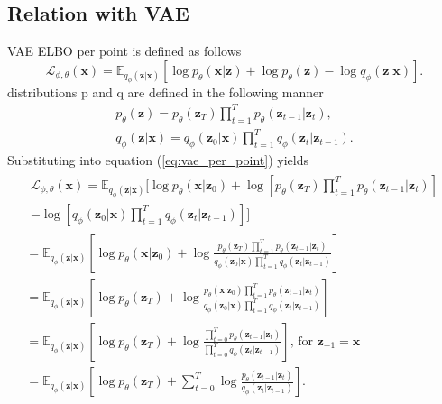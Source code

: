 \documentclass[10pt]{article}
\begin{document}
\subsection{Relation with VAE}
VAE ELBO per point is defined as follows
\begin{equation}
\label{eq:vae_per_point}
    \mathcal{L}_{\phi, \theta}(\textbf{x}) =  
      \mathbb{E}_{q_{\phi }(\textbf{z}|\textbf{x})}
    \left[ \log p_{\theta }(\textbf{x}| \textbf{z}) +\log p_{\theta}(\textbf{z}) -
   \log q_{\phi }(\textbf{z}|\textbf{x}) \right].
\end{equation}
distributions p and q are defined in the following manner
\begin{gather}
   p_{\theta}(\textbf{z}) = p_{\theta}(\textbf{z}_T)
   \prod^{T}_{t=1} p_{\theta}(\textbf{z}_{t-1}| \textbf{z}_{t}), \\ 
   q_{\phi }(\textbf{z}|\textbf{x})  = q_{\phi }(\textbf{z}_0|\textbf{x}) 
   \prod^{T}_{t=1}  q_{\phi }(\textbf{z}_{t}| \textbf{z}_{t-1}) .
\end{gather}
Substituting into equation (\ref{eq:vae_per_point}) yields
\begin{gather}
    \begin{gathered}
    \mathcal{L}_{\phi, \theta}(\textbf{x}) =  
      \mathbb{E}_{q_{\phi }(\textbf{z}|\textbf{x})}
    \Bigg[ \log p_{\theta }(\textbf{x}| \textbf{z}_0) +
    \log[p_{\theta}(\textbf{z}_T)\prod^{T}_{t=1} p_{\theta}(\textbf{z}_{t-1}| \textbf{z}_{t})]\\ -
   \log [q_{\phi }(\textbf{z}_0|\textbf{x}) 
   \prod^{T}_{t=1}  q_{\phi }(\textbf{z}_{t}| \textbf{z}_{t-1}) ]
   \Bigg] 
       \end{gathered}
       \\
   = \mathbb{E}_{q_{\phi }(\textbf{z}|\textbf{x})} \left[\log p_{\theta }(\textbf{x}| \textbf{z}_0) + \log \frac
   {p_{\theta}(\textbf{z}_T)\prod^{T}_{t=1} p_{\theta}(\textbf{z}_{t-1}| \textbf{z}_{t})}
   {q_{\phi }(\textbf{z}_0|\textbf{x})\prod^{T}_{t=1}  q_{\phi }(\textbf{z}_{t}| \textbf{z}_{t-1})}
   \right] \\
   = \mathbb{E}_{q_{\phi }(\textbf{z}|\textbf{x})} \left[ \log p_{\theta}(\textbf{z}_T) +
   \log \frac
   {p_{\theta }(\textbf{x}| \textbf{z}_0) \prod^{T}_{t=1} p_{\theta}(\textbf{z}_{t-1}| \textbf{z}_{t})} 
   {q_{\phi }(\textbf{z}_0|\textbf{x})\prod^{T}_{t=1}  q_{\phi }(\textbf{z}_{t}| \textbf{z}_{t-1})}
   \right] \\
   = \mathbb{E}_{q_{\phi }(\textbf{z}|\textbf{x})} \left[ \log p_{\theta}(\textbf{z}_T) +
   \log \frac
   { \prod^{T}_{t=0} p_{\theta}(\textbf{z}_{t-1}| \textbf{z}_{t})} 
   {\prod^{T}_{t=0}  q_{\phi }(\textbf{z}_{t}| \textbf{z}_{t-1})}
   \right] \text{,  for } \textbf{z}_{-1} = \textbf{x} \\
   = \label{eq:vae_diff}
   \mathbb{E}_{q_{\phi }(\textbf{z}|\textbf{x})} \left[ \log p_{\theta}(\textbf{z}_T) +
    \sum^T_{t=0}\log \frac
   { p_{\theta}(\textbf{z}_{t-1}| \textbf{z}_{t})} 
   {  q_{\phi }(\textbf{z}_{t}| \textbf{z}_{t-1})}
   \right].
\end{gather}
\end{document}
